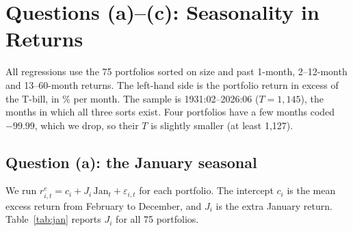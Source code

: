 
\section{Questions (a)--(c): Seasonality in Returns}

All regressions use the 75 portfolios sorted on size and past 1-month, 2--12-month and
13--60-month returns. The left-hand side is the portfolio return in excess of the T-bill, in
\% per month. The sample is 1931:02--2026:06 ($T=1{,}145$), the months in which all three
sorts exist. Four portfolios have a few months coded $-99.99$, which we drop, so their $T$ is
slightly smaller (at least 1{,}127).

\subsection*{Question (a): the January seasonal}

We run $r^e_{i,t} = c_i + J_i\,\mathrm{Jan}_t + \varepsilon_{i,t}$ for each portfolio. The
intercept $c_i$ is the mean excess return from February to December, and $J_i$ is the extra
January return. Table~\ref{tab:jan} reports $J_i$ for all 75 portfolios.

